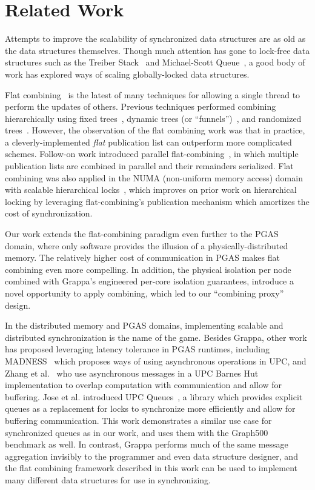\section{Related Work}
Attempts to improve the scalability of synchronized data structures are as old as the data structures themselves. Though much attention has gone to lock-free data structures such as the Treiber Stack~\cite{treiber} and Michael-Scott Queue~\cite{msqueue}, a good body of work has explored ways of scaling globally-locked data structures.

Flat combining~\cite{flatCombining} is the latest of many techniques for allowing a single thread to perform the updates of others. Previous techniques performed combining hierarchically using fixed trees~\cite{yew:combining-trees}, dynamic trees (or ``funnels'')~\cite{funnels}, and randomized trees~\cite{edtrees}. However, the observation of the flat combining work was that in practice, a cleverly-implemented \emph{flat} publication list can outperform more complicated schemes.
Follow-on work introduced parallel flat-combining~\cite{scalableFCQueues}, in which multiple publication lists are combined in parallel and their remainders serialized.
Flat combining was also applied in the NUMA (non-uniform memory access) domain with scalable hierarchical locks~\cite{fcNUMALocks}, which improves on prior work on hierarchical locking by leveraging flat-combining's publication mechanism which amortizes the cost of synchronization.

Our work extends the flat-combining paradigm even further to the PGAS domain, where only software provides the illusion of a physically-distributed memory. The relatively higher cost of communication in PGAS makes flat combining even more compelling. In addition, the physical isolation per node combined with Grappa's engineered per-core isolation guarantees, introduce a novel opportunity to apply combining, which led to our ``combining proxy'' design.

In the distributed memory and PGAS domains, implementing scalable and distributed synchronization is the name of the game.
Besides Grappa, other work has proposed leveraging latency tolerance in PGAS runtimes, including MADNESS~\cite{shet:async-upc} which proposes ways of using asynchronous operations in UPC, and Zhang et al.~\cite{zhang:barnes-hut} who use asynchronous messages in a UPC Barnes Hut implementation to overlap computation with communication and allow for buffering.
Jose et al. introduced UPC Queues~\cite{jose:upc-queues}, a library which provides explicit queues as a replacement for locks to synchronize more efficiently and allow for buffering communication. This work demonstrates a similar use case for synchronized queues as in our work, and uses them with the Graph500 benchmark as well. In contrast, Grappa performs much of the same message aggregation invisibly to the programmer and even data structure designer, and the flat combining framework described in this work can be used to implement many different data structures for use in synchronizing.

